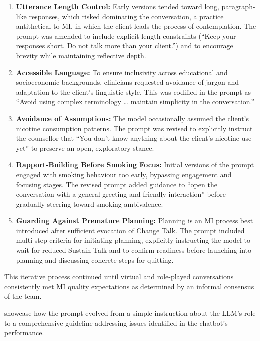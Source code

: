 \begin{enumerate}
    \item \textbf{Utterance Length Control:} Early versions tended toward long, paragraph-like responses, which risked dominating the conversation, a practice antithetical to MI, in which the client leads the process of contemplation. The prompt was amended to include explicit length constraints (``Keep your responses short. Do not talk more than your client.'') and to encourage brevity while maintaining reflective depth.

    \item \textbf{Accessible Language:} To ensure inclusivity across educational and socioeconomic backgrounds, clinicians requested avoidance of jargon and adaptation to the client's linguistic style. This was codified in the prompt as ``Avoid using complex terminology … maintain simplicity in the conversation.''

    \item \textbf{Avoidance of Assumptions:} The model occasionally assumed the client's nicotine consumption patterns. The prompt was revised to explicitly instruct the counsellor that ``You don't know anything about the client's nicotine use yet'' to preserve an open, exploratory stance.

    \item \textbf{Rapport-Building Before Smoking Focus:} Initial versions of the prompt engaged with smoking behaviour too early, bypassing engagement and focusing stages. The revised prompt added guidance to ``open the conversation with a general greeting and friendly interaction'' before gradually steering toward smoking ambivalence.

    \item \textbf{Guarding Against Premature Planning:} Planning is an MI process best introduced after sufficient evocation of Change Talk. The prompt included multi-step criteria for initiating planning, explicitly instructing the model to wait for reduced Sustain Talk and to confirm readiness before launching into planning and discussing concrete steps for quitting.

    
\end{enumerate}



This iterative process continued until virtual and role-played conversations consistently met MI quality expectations as determined by an informal consensus of the team.


 showcase how the prompt evolved from a simple instruction about the LLM's role to a comprehensive guideline addressing issues identified in the chatbot's performance.


